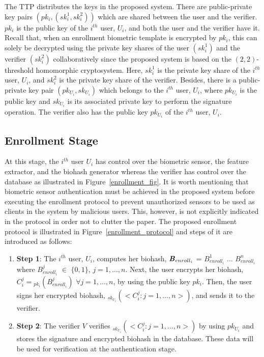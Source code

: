 \documentclass[journal]{IEEEtran}
\begin{document}
The TTP distributes the keys in the proposed system. There are public-private key pairs $(pk_i, (sk_i^1, sk_i^2))$ which are shared between the user and the verifier. $pk_i$ is the public key of the $i^{th}$ user, $U_i$, and both the user and the verifier have it. Recall that, when an enrollment biometric template is encrypted by $pk_i$, this can solely be decrypted using the private key shares of the user $(sk_i^1)$ and the verifier $(sk_i^2)$ collaboratively since the proposed system  is based on the $(2,2)$-threshold homomorphic cryptosystem. Here, $sk_i^1$ is the private key share of the $i^{th}$ user, $U_i$, and $sk_i^2$ is the private key share of the verifier.  Besides, there is a public-private key pair $(pk_{U_i}, sk_{U_i})$ which belongs to the $i^{th}$ user, $U_i$, where $pk_{U_i}$ is the public key and $sk_{U_i}$ is its associated private key to perform the signature operation. The verifier also has the public key $pk_{U_i}$ of the $i^{th}$ user, $U_i$.

\subsection{Enrollment Stage}

At this stage, the $i^{th}$ user $U_i$ has control over the biometric sensor, the feature extractor, and the biohash generator whereas the verifier has control over the database as  illustrated in Figure~\ref{enrollment_fig}. It is worth mentioning that biometric sensor authentication must be achieved in the proposed system before executing the enrollment protocol to prevent unauthorized sensors to be used as clients in the system by malicious users. This, however, is not explicitly indicated in the protocol in order not to clutter the paper. The proposed enrollment protocol is illustrated in Figure~\ref{enrollment_protocol} and steps of it are introduced as follows:


\begin{enumerate}

\item \textbf{Step 1}: The $i^{th}$ user, $U_i$, computes her biohash, $\textbf{\textit{B}}_{enroll_i}$ = ${\textit{B}}^1_{enroll_i}$ $\ldots$ ${\textit{B}}^n_{enroll_i}$ where ${\textit{B}}^j_{enroll_i}$ $\in$ $\{0,1\}$, $j=1,\ldots,n$. Next, the user encrypts her biohash, $C^{j}_{i} = $$_{pk_i}\left({\textit{B}}^j_{enroll_i}\right)$ $\forall j=1,\ldots,n$, by using the public key $pk_i$. Then, the user signs her encrypted biohash, $_{sk_{U_i}}(<C^{j}_{i}:j=1,\ldots,n>)$, and sends it to the verifier. 

\item \textbf{Step 2}: The verifier $V$ verifies $_{sk_{U_i}}(<C^{j}_{i}:j=1,\ldots,n>)$ by using $pk_{U_i}$ and stores the signature and encrypted biohash in the database. These data will be used for verification at the authentication stage. 
\end{enumerate}
\end{document}
